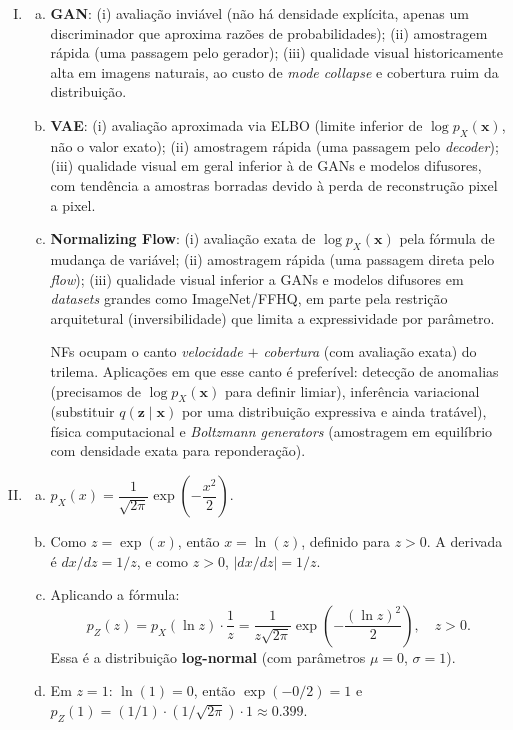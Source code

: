 \documentclass{dlproblemset}
\begin{document}
\begin{enumerate}[I)]
    \item
    \begin{enumerate}[(a)]
        \item \textbf{GAN}: (i) avaliação inviável (não há densidade explícita, apenas um discriminador que aproxima razões de probabilidades); (ii) amostragem rápida (uma passagem pelo gerador); (iii) qualidade visual historicamente alta em imagens naturais, ao custo de \textit{mode collapse} e cobertura ruim da distribuição.
        \item \textbf{VAE}: (i) avaliação aproximada via ELBO (limite inferior de $\log p_X(\mathbf{x})$, não o valor exato); (ii) amostragem rápida (uma passagem pelo \textit{decoder}); (iii) qualidade visual em geral inferior à de GANs e modelos difusores, com tendência a amostras borradas devido à perda de reconstrução pixel a pixel.
        \item \textbf{Normalizing Flow}: (i) avaliação exata de $\log p_X(\mathbf{x})$ pela fórmula de mudança de variável; (ii) amostragem rápida (uma passagem direta pelo \textit{flow}); (iii) qualidade visual inferior a GANs e modelos difusores em \textit{datasets} grandes como ImageNet/FFHQ, em parte pela restrição arquitetural (inversibilidade) que limita a expressividade por parâmetro.

        NFs ocupam o canto \emph{velocidade $+$ cobertura} (com avaliação exata) do trilema. Aplicações em que esse canto é preferível: detecção de anomalias (precisamos de $\log p_X(\mathbf{x})$ para definir limiar), inferência variacional (substituir $q(\mathbf{z}\mid \mathbf{x})$ por uma distribuição expressiva e ainda tratável), física computacional e \textit{Boltzmann generators} (amostragem em equilíbrio com densidade exata para reponderação).
    \end{enumerate}

    \item
    \begin{enumerate}[(a)]
        \item $p_X(x) = \dfrac{1}{\sqrt{2\pi}} \exp\!\left(-\dfrac{x^2}{2}\right)$.
        \item Como $z = \exp(x)$, então $x = \ln(z)$, definido para $z > 0$. A derivada é $dx/dz = 1/z$, e como $z > 0$, $|dx/dz| = 1/z$.
        \item Aplicando a fórmula:
        \[
            p_Z(z) = p_X(\ln z) \cdot \frac{1}{z} = \frac{1}{z\sqrt{2\pi}} \exp\!\left(-\frac{(\ln z)^2}{2}\right), \quad z > 0.
        \]
        Essa é a distribuição \textbf{log-normal} (com parâmetros $\mu = 0$, $\sigma = 1$).
        \item Em $z = 1$: $\ln(1) = 0$, então $\exp(-0/2) = 1$ e $p_Z(1) = (1/1) \cdot (1/\sqrt{2\pi}) \cdot 1 \approx 0.399$.
    \end{enumerate}
\end{enumerate}

\color{black}
\end{document}
